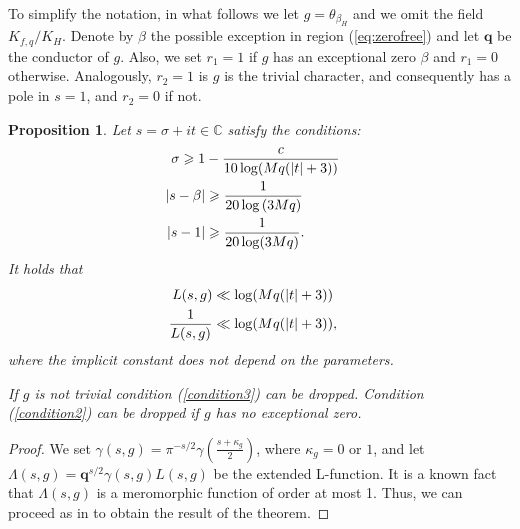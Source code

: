 \documentclass[12pt]{amsart}
\newtheorem{prop}{Proposition}
\def\C{{\mathbb C}}
\def\\{\cr}
\def\ge{\geqslant}
\begin{document}
To simplify the notation, in what follows we let $g= \theta_{\beta_H}$  and we omit the field $K_{f,q} /K_H$. Denote by $\beta$ the possible exception in region (\ref{eq:zerofree}) and let $\boldsymbol{q}$ be the conductor of $g$. Also, we set $r_1=1$ if $g$ has an exceptional zero $\beta$ and $r_1 = 0$ otherwise.  Analogously, $r_2=1$ is $g$ is the trivial character, and consequently has a pole in $s=1$, and $r_2=0$ if not.

\begin{prop}
\label{prop1}
Let $s=\sigma + it \in \C$ satisfy the conditions:
\begin{align}
\label{condition1}
\sigma \ge 1 & - \frac{c}{10\log( M{q}(|t|+3))} \\
\label{condition2}
| s - \beta |& \ge \frac{1}{ 20 \log{(3M{q})}} \\
\label{condition3}
|s-1| & \ge \frac{1}{20 \log(3M{q})}.
\end{align}
It holds that 
\begin{equation*}
\begin{split}
L(s,g) & \ll \log( Mq(|t|+3))\\
\frac{1}{L(s,g)} & \ll \log(M q(|t|+3)),\\
\end{split}
\end{equation*}
where the implicit constant does not depend on the parameters.

If $g$ is not trivial condition (\ref{condition3}) can be dropped. Condition (\ref{condition2}) can be dropped if $g$ has no exceptional zero.
\end{prop}

\begin{proof}


We set $\gamma(s,g) = \pi^{-s/2} \gamma\left(\frac{s+\kappa_g}{2}\right)$, where $\kappa_g=0$ or $1$, and let $\Lambda(s,g) = \boldsymbol{q}^{s/2}\gamma(s,g) L(s,g)$  be the extended L-function. It is a known fact that $\Lambda(s,g)$ is a meromorphic function of order at most 1. Thus,  we can proceed as in \cite[Theorem 11.4]{M-V2} to obtain the result of the theorem.


\end{proof}
\end{document}
